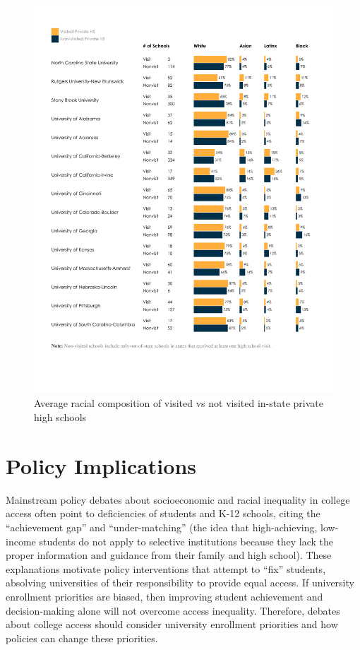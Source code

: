\documentclass{article}
\begin{document}
\begin{figure}[!ht]
    \centering
    \includegraphics[width=\textwidth, trim={1.25cm, 4cm, 1cm, 1.5cm}, clip]{assets/graphs/race_graph_priv_in.pdf}
    \caption{Average racial composition of visited vs not visited in-state private high schools}
    \label{fig:race_graph_priv_in}
\end{figure}

\section*{Policy Implications}

Mainstream policy debates about socioeconomic and racial inequality in college access often point to deficiencies of students and K-12 schools, citing the ``achievement gap'' and ``under-matching'' (the idea that high-achieving, low-income students do not apply to selective institutions because they lack the proper information and guidance from their family and high school). These explanations motivate policy interventions that attempt to ``fix'' students, absolving universities of their responsibility to provide equal access. If university enrollment priorities are biased, then improving student achievement and decision-making alone will not overcome access inequality. Therefore, debates about college access should consider university enrollment priorities and how policies can change these priorities.
\end{document}
